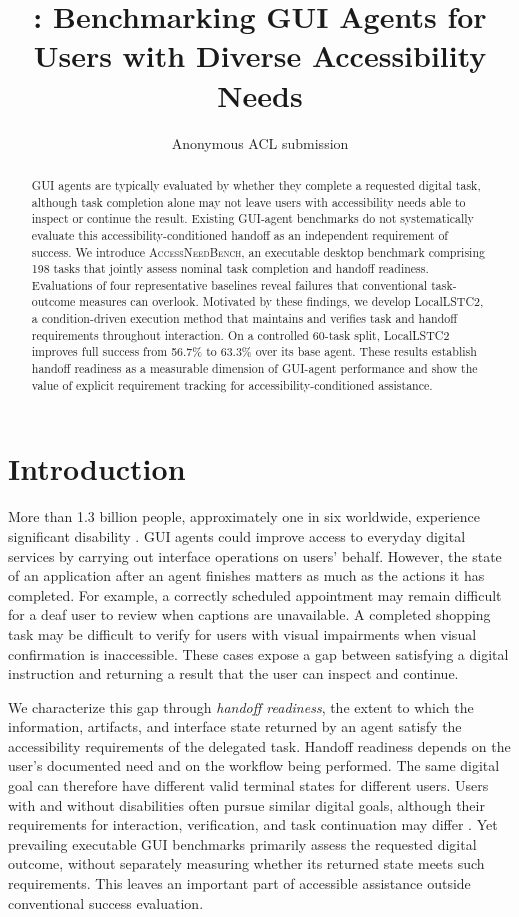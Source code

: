 \documentclass[11pt]{article}
\title{\bench: Benchmarking GUI Agents for Users with Diverse Accessibility Needs}
\author{Anonymous ACL submission}
\newcommand{\bench}{\textsc{AccessNeedBench}\xspace}
\begin{document}
\maketitle

\begin{abstract}
GUI agents are typically evaluated by whether they complete a requested digital task, although task completion alone may not leave users with accessibility needs able to inspect or continue the result. Existing GUI-agent benchmarks do not systematically evaluate this accessibility-conditioned handoff as an independent requirement of success. We introduce \bench, an executable desktop benchmark comprising 198 tasks that jointly assess nominal task completion and handoff readiness. Evaluations of four representative baselines reveal failures that conventional task-outcome measures can overlook. Motivated by these findings, we develop LocalLSTC2, a condition-driven execution method that maintains and verifies task and handoff requirements throughout interaction. On a controlled 60-task split, LocalLSTC2 improves full success from 56.7\% to 63.3\% over its base agent. These results establish handoff readiness as a measurable dimension of GUI-agent performance and show the value of explicit requirement tracking for accessibility-conditioned assistance.
\end{abstract}

\section{Introduction}

More than 1.3 billion people, approximately one in six worldwide, experience significant disability \citep{whodisability}. GUI agents could improve access to everyday digital services by carrying out interface operations on users' behalf. However, the state of an application after an agent finishes matters as much as the actions it has completed. For example, a correctly scheduled appointment may remain difficult for a deaf user to review when captions are unavailable. A completed shopping task may be difficult to verify for users with visual impairments when visual confirmation is inaccessible. These cases expose a gap between satisfying a digital instruction and returning a result that the user can inspect and continue.

We characterize this gap through \emph{handoff readiness}, the extent to which the information, artifacts, and interface state returned by an agent satisfy the accessibility requirements of the delegated task. Handoff readiness depends on the user's documented need and on the workflow being performed. The same digital goal can therefore have different valid terminal states for different users. Users with and without disabilities often pursue similar digital goals, although their requirements for interaction, verification, and task continuation may differ \citep{a11ycua,arewethereyet}. Yet prevailing executable GUI benchmarks primarily assess the requested digital outcome, without separately measuring whether its returned state meets such requirements. This leaves an important part of accessible assistance outside conventional success evaluation.
\end{document}
